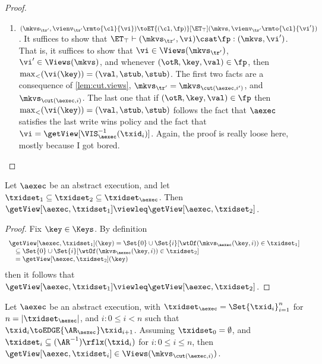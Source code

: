 \begin{proof}
\begin{itemize}
\begin{enumerate}
\item $(\mkvs_{\tr'}, \vienv_{\tr'}\rmto{\cl}{\vi}) \toET{(\cl, \fp)}[\ET_{\top}] (\mkvs,  \vienv_{\tr'}\rmto{\cl}{\vi'})$. 
    It suffices to show that $\ET_{\top} \vdash (\mkvs_{\tr'}, \vi) \csat \fp: (\mkvs,\vi')$. 
That is, it suffices to show that $\vi \in \Views(\mkvs_{\tr'})$, $\vi' \in \Views(\mkvs)$, 
and whenever $(\otR, \key, \val) \in \fp$, then $\max_{<}(\vi(\key)) = (\val, \stub, \stub)$. 
The first two facts are a consequence of \cref{lem:cut.views}, $\mkvs_{\tr'} = \mkvs_{\cut(\aexec, i')}$, and  $\mkvs_{\cut(\aexec, i)}$. 
The last one that if $(\otR, \key, \val) \in \fp$ then $\max_{<}(\vi(\key)) = (\val, \stub, \stub)$ follows the fact that 
$\aexec$ satisfies the last write wins policy and the fact that $\vi = \getView[\VIS^{-1}_{\aexec}(\txid_{i})]$.
\ac{Again, the proof is really loose here, mostly because I got bored.}
\end{enumerate} 

\end{itemize}
\end{proof}

\begin{lemma}
\label{lem:getView.monotone}
Let $\aexec$ be an abstract execution, and let $\txidset_1 \subseteq \txidset_2 \subseteq \txidset_{\aexec}$. 
Then $\getView[\aexec, \txidset_1] \viewleq \getView[\aexec, \txidset_2]$.
\end{lemma}
\begin{proof}
Fix $\key \in \Keys$. By definition  
\[
\begin{array}{l}
    \getView[\aexec, \txidset_1](\key) = \Set{0} \cup \Set{i}[\wtOf(\mkvs_{\aexec}(\key, i)) \in \txidset_1] \\
    \quad \subseteq \Set{0} \cup \Set{i}[\wtOf(\mkvs_{\aexec}(\key, i)) \in \txidset_2] \\
\quad = \getView[\aexec, \txidset_2](\key)
\end{array}
\]
then it follows that  $\getView[\aexec, \txidset_1] \viewleq \getView[\aexec, \txidset_2]$.
\end{proof}

\begin{lemma}
\label{lem:cut.views}
Let $\aexec$ be an abstract execution, with $\txidset_{\aexec} = \Set{\txid_{i}}_{i = 1}^{n}$ for 
$n = \lvert \txidset_{\aexec} \rvert$, and \( i : 0 \leq i < n\) such that $\txid_{i} \toEDGE{\AR_{\aexec}} \txid_{i+1}$.
Assuming $\txidset_{0} = \emptyset$, and $\txidset_{i} \subseteq (\AR^{-1})\rflx(\txid_{i})$ for $i : 0 \leq i \leq n$,
then $\getView[\aexec, \txidset_{i}] \in \Views(\mkvs_{\cut(\aexec, i)})$.
\end{lemma}

